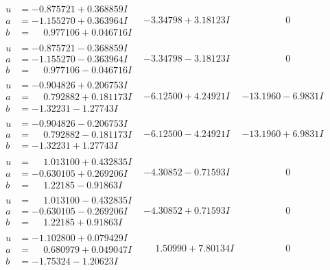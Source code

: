 \documentclass[1p]{elsarticle_modified}
\theoremstyle{definition}
\begin{document}
$$\begin{array}{c|c|c}
\begin{aligned}
u &= -0.875721 + 0.368859 I \\
a &= -1.155270 + 0.363964 I \\
b &= \phantom{-}0.977106 + 0.046716 I\end{aligned}
 & -3.34798 + 3.18123 I & \phantom{-0.000000 } 0 \\ \hline\begin{aligned}
u &= -0.875721 - 0.368859 I \\
a &= -1.155270 - 0.363964 I \\
b &= \phantom{-}0.977106 - 0.046716 I\end{aligned}
 & -3.34798 - 3.18123 I & \phantom{-0.000000 } 0 \\ \hline\begin{aligned}
u &= -0.904826 + 0.206753 I \\
a &= \phantom{-}0.792882 + 0.181173 I \\
b &= -1.32231 - 1.27743 I\end{aligned}
 & -6.12500 + 4.24921 I & -13.1960 - 6.9831 I \\ \hline\begin{aligned}
u &= -0.904826 - 0.206753 I \\
a &= \phantom{-}0.792882 - 0.181173 I \\
b &= -1.32231 + 1.27743 I\end{aligned}
 & -6.12500 - 4.24921 I & -13.1960 + 6.9831 I \\ \hline\begin{aligned}
u &= \phantom{-}1.013100 + 0.432835 I \\
a &= -0.630105 + 0.269206 I \\
b &= \phantom{-}1.22185 - 0.91863 I\end{aligned}
 & -4.30852 - 0.71593 I & \phantom{-0.000000 } 0 \\ \hline\begin{aligned}
u &= \phantom{-}1.013100 - 0.432835 I \\
a &= -0.630105 - 0.269206 I \\
b &= \phantom{-}1.22185 + 0.91863 I\end{aligned}
 & -4.30852 + 0.71593 I & \phantom{-0.000000 } 0 \\ \hline\begin{aligned}
u &= -1.102800 + 0.079429 I \\
a &= \phantom{-}0.680979 + 0.049047 I \\
b &= -1.75324 - 1.20623 I\end{aligned}
 & \phantom{-}1.50990 + 7.80134 I & \phantom{-0.000000 } 0 \\ \hline\begin{aligned}

\end{aligned}
\end{array}$$
\end{document}
